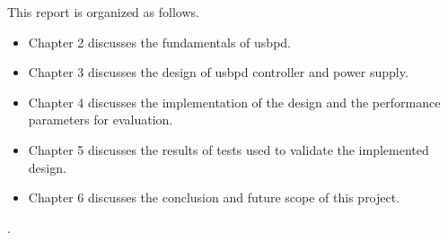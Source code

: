 This report is organized as follows.  
\begin{itemize}
\item Chapter 2 discusses the fundamentals of \gls{usbpd}. 
\item Chapter 3 discusses the design of \gls{usbpd} controller and power supply.
\item Chapter 4 discusses the implementation of the design and the performance parameters for evaluation.
\item Chapter 5 discusses the results of tests used to validate the implemented design.
\item Chapter 6 discusses the conclusion and future scope of this project.
\end{itemize}

.